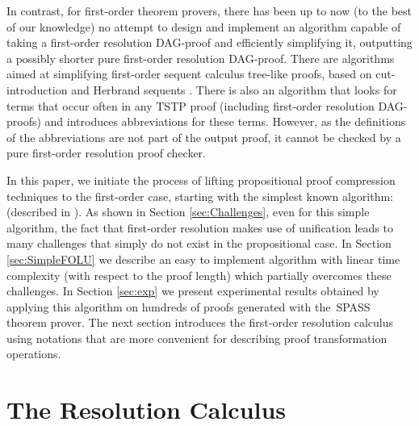\documentclass{llncs}
\begin{document}
In contrast, for first-order theorem provers, there has been up to now (to the best of our knowledge) no attempt to design and implement an algorithm capable of taking a first-order resolution DAG-proof and efficiently simplifying it, outputting a possibly shorter pure first-order resolution DAG-proof. There are algorithms aimed at simplifying first-order sequent calculus tree-like proofs, based on cut-introduction and Herbrand sequents \cite{BrunoLPAR,Hetzl,HerbrandSequent}. There is also an algorithm \cite{LPARCzech} that looks for terms that occur often in any TSTP \cite{TPTP} proof (including first-order resolution DAG-proofs) and introduces abbreviations for these terms. However, as the definitions of the abbreviations are not part of the output proof, it cannot be checked by a pure first-order resolution proof checker.

In this paper, we initiate the process of lifting propositional proof compression techniques to the first-order case, starting with the simplest known algorithm: {\LowerUnits} (described in \cite{LURPI}). 
As shown in Section \ref{sec:Challenges}, even for this simple algorithm, the fact that first-order resolution makes use of unification leads to many challenges that simply do not exist in the propositional case. In Section \ref{sec:SimpleFOLU} we describe an easy to implement algorithm with  linear time complexity (with respect to the proof length) which partially overcomes these challenges. 
In Section \ref{sec:exp} we present experimental results obtained by applying this algorithm on hundreds of proofs generated with the{\
SPASS} theorem prover. 
The next section introduces the first-order resolution calculus using notations that are more convenient for describing proof transformation operations.





\section{The Resolution Calculus}
\end{document}
